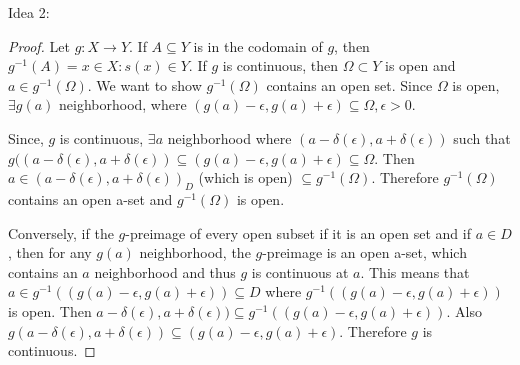 \documentclass[10pt]{article}
\theoremstyle{definition}
\begin{document}
\begin{enumerate}
Idea 2:
\begin{proof}
Let $g : X \rightarrow Y$.  If $A \subseteq Y$ is in the codomain of $g$, then $g^{-1}(A)={x \in X : s(x) \in Y}$.  If $g$ is continuous, then $\Omega \subset Y$ is open and $a \in g^{-1}(\Omega)$. We want to show $g^{-1}(\Omega)$ contains an open set.  Since $\Omega$ is open, $\exists g(a)$ neighborhood, where $(g(a) - \epsilon, g(a) + \epsilon) \subseteq \Omega, \epsilon > 0$.  

Since, $g$ is continuous, $\exists a$ neighborhood where $(a-\delta(\epsilon), a+\delta(\epsilon))$ such that $g((a-\delta(\epsilon), a+\delta(\epsilon)) \subseteq (g(a) - \epsilon, g(a)+\epsilon) \subseteq \Omega$.  Then $a \in (a-\delta(\epsilon), a+\delta(\epsilon))_D$ (which is open) $\subseteq g^{-1}(\Omega)$.  Therefore $g^{-1}(\Omega)$ contains an open a-set and $g^{-1}(\Omega)$ is open.

Conversely, if the $g$-preimage of every open subset if it is an open set and if $a \in D$, then for any $g(a)$ neighborhood, the $g$-preimage is an open a-set, which contains an $a$ neighborhood and thus $g$ is continuous at $a$.  This means that $a \in g^{-1}((g(a)-\epsilon, g(a)+\epsilon)) \subseteq D$ where $g^{-1}((g(a)-\epsilon, g(a)+\epsilon))$ is open.  Then $a-\delta(\epsilon), a+\delta(\epsilon)) \subseteq g^{-1}((g(a)-\epsilon, g(a)+\epsilon))$.  Also $g(a-\delta(\epsilon), a+\delta(\epsilon)) \subseteq (g(a)-\epsilon,g(a)+\epsilon)$.  Therefore $g$ is continuous.

\end{proof}

\end{enumerate}
\end{document}
